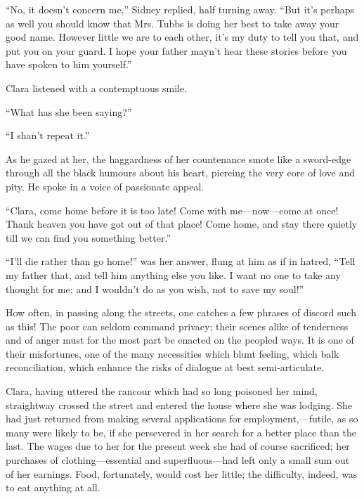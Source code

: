 ``No, it doesn't concern me,'' Sidney replied, half turning away. ``But
it's perhaps as well you should know that Mrs. Tubbs is doing her best
to take away your good name. However little we are to each other, it's
my duty to tell you that, and put you on your guard. I hope your father
mayn't hear these stories before you have spoken to him yourself.''

Clara listened with a contemptuous smile.

``What has she been saying?''

``I shan't repeat it.''

{\protect\hypertarget{225}{}{}}As he gazed at her, the haggardness of
her countenance smote like a sword-edge through all the black humours
about his heart, piercing the very core of love and pity. He spoke in a
voice of passionate appeal.

``Clara, come home before it is too late! Come with me---now---come at
once! Thank heaven you have got out of that place! Come home, and stay
there quietly till we can find you something better.''

``I'll die rather than go home!'' was her answer, flung at him as if in
hatred, ``Tell my father that, and tell him anything else you like. I
want no one to take any thought for me; and I wouldn't do as you wish,
not to save my soul!''

How often, in passing along the streets, one catches a few phrases of
discord such as this! The poor can seldom command privacy; their scenes
alike of tenderness and of anger must for the most part be enacted on
the peopled ways. It is one of their misfortunes, one of the many
necessities which blunt feeling, which balk reconciliation,
{\protect\hypertarget{226}{}{}}which enhance the risks of dialogue at
best semi-articulate.

Clara, having uttered the rancour which had so long poisoned her mind,
straightway crossed the street and entered the house where she was
lodging. She had just returned from making several applications for
employment,---futile, as so many were likely to be, if she persevered in
her search for a better place than the last. The wages due to her for
the present week she had of course sacrificed; her purchases of
clothing---essential and superfluous---had left only a small sum out of
her earnings. Food, fortunately, would cost her little; the difficulty,
indeed, was to eat anything at all.

